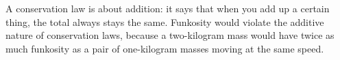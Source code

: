 A conservation law is about addition: it says that when you add up a certain
thing, the total always stays the same. Funkosity would violate the additive
nature of conservation laws, because a two-kilogram mass would have
twice as much funkosity as a pair of one-kilogram masses moving at the same speed.



